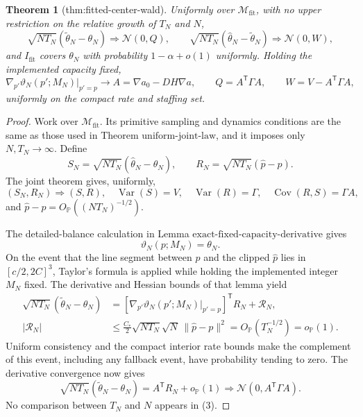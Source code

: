 \documentclass{article}
\newtheorem{theorem}{Theorem}
\begin{document}
\begin{theorem}[thm:fitted-center-wald]\label{thm:fitted-center-wald}
Uniformly over \(\mathcal M_{\mathrm{fit}}\), with no upper restriction on the relative growth of \(T_N\) and \(N\),
\[
 \sqrt{NT_N}(\widetilde\theta_N-\theta_N)\Rightarrow\mathcal N(0,Q),
 \qquad
 \sqrt{NT_N}(\widehat\theta_N-\widetilde\theta_N)\Rightarrow\mathcal N(0,W),
\]
and \(I_{\mathrm{fit}}\) covers \(\theta_N\) with probability \(1-\alpha+o(1)\) uniformly.  Holding the implemented capacity fixed,
\[
 \nabla_{p'}\vartheta_N(p';M_N)\big|_{p'=p}\longrightarrow
 A=\nabla a_0-DH\nabla a,
 \qquad Q=A^{\mathsf T}\Gamma A,
 \qquad W=V-A^{\mathsf T}\Gamma A,
\]
uniformly on the compact rate and staffing set.
\end{theorem}
\begin{proof}
Work over \(\mathcal M_{\mathrm{fit}}\).  Its primitive sampling and dynamics conditions are the same as those used in Theorem \(\mathrm{uniform\mbox{-}joint\mbox{-}law}\), and it imposes only \(N,T_N\to\infty\).  Define
\[
 S_N=\sqrt{NT_N}(\widehat\theta_N-\theta_N),
 \qquad R_N=\sqrt{NT_N}(\widehat p-p).
\]
The joint theorem gives, uniformly,
\[
 (S_N,R_N)\Rightarrow(S,R),
 \quad \operatorname{Var}(S)=V,
 \quad \operatorname{Var}(R)=\Gamma,
 \quad \operatorname{Cov}(R,S)=\Gamma A,                      \tag{1}
\]
and \(\widehat p-p=O_{\mathbb P}((NT_N)^{-1/2})\).

The detailed-balance calculation in Lemma \(\mathrm{exact\mbox{-}fixed\mbox{-}capacity\mbox{-}derivative}\) gives
\[
 \vartheta_N(p;M_N)=\theta_N.                                 \tag{2}
\]
On the event that the line segment between \(p\) and the clipped \(\widehat p\) lies in \([c/2,2C]^3\), Taylor's formula is applied while holding the implemented integer \(M_N\) fixed.  The derivative and Hessian bounds of that lemma yield
\[
 \begin{split}
 \sqrt{NT_N}(\widetilde\theta_N-\theta_N)
 &=[\nabla_{p'}\vartheta_N(p';M_N)|_{p'=p}]^{\mathsf T}R_N+\mathcal R_N,\\
 |\mathcal R_N|
 &\leq\frac{C_*}{2}\sqrt{NT_N}\sqrt N\,\|\widehat p-p\|^2
 =O_{\mathbb P}(T_N^{-1/2})=o_{\mathbb P}(1).                 \tag{3}
 \end{split}
\]
Uniform consistency and the compact interior rate bounds make the complement of this event, including any fallback event, have probability tending to zero.  The derivative convergence now gives
\[
 \sqrt{NT_N}(\widetilde\theta_N-\theta_N)
 =A^{\mathsf T}R_N+o_{\mathbb P}(1)
 \Rightarrow\mathcal N(0,A^{\mathsf T}\Gamma A).             \tag{4}
\]
No comparison between \(T_N\) and \(N\) appears in (3).


\end{proof}
\end{document}
